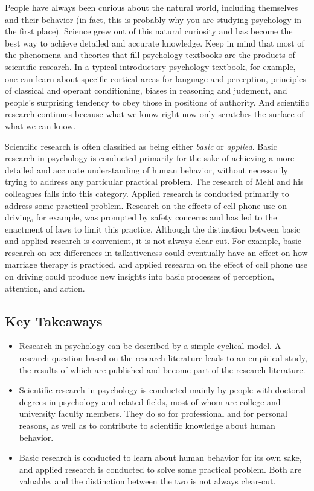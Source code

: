 \documentclass[]{book}
\theoremstyle{definition}
\theoremstyle{definition}
\theoremstyle{remark}
\begin{document}
People have always been curious about the natural world, including
themselves and their behavior (in fact, this is probably why you are
studying psychology in the first place). Science grew out of this
natural curiosity and has become the best way to achieve detailed and
accurate knowledge. Keep in mind that most of the phenomena and theories
that fill psychology textbooks are the products of scientific research.
In a typical introductory psychology textbook, for example, one can
learn about specific cortical areas for language and perception,
principles of classical and operant conditioning, biases in reasoning
and judgment, and people's surprising tendency to obey those in
positions of authority. And scientific research continues because what
we know right now only scratches the surface of what we can know.

Scientific research is often classified as being either \emph{basic} or
\emph{applied}. Basic research in psychology is conducted primarily for
the sake of achieving a more detailed and accurate understanding of
human behavior, without necessarily trying to address any particular
practical problem. The research of Mehl and his colleagues falls into
this category. Applied research is conducted primarily to address some
practical problem. Research on the effects of cell phone use on driving,
for example, was prompted by safety concerns and has led to the
enactment of laws to limit this practice. Although the distinction
between basic and applied research is convenient, it is not always
clear-cut. For example, basic research on sex differences in
talkativeness could eventually have an effect on how marriage therapy is
practiced, and applied research on the effect of cell phone use on
driving could produce new insights into basic processes of perception,
attention, and action.

\subsection{Key Takeaways}\label{key-takeaways-1}

\begin{itemize}
\item
  Research in psychology can be described by a simple cyclical model. A
  research question based on the research literature leads to an
  empirical study, the results of which are published and become part of
  the research literature.
\item
  Scientific research in psychology is conducted mainly by people with
  doctoral degrees in psychology and related fields, most of whom are
  college and university faculty members. They do so for professional
  and for personal reasons, as well as to contribute to scientific
  knowledge about human behavior.
\item
  Basic research is conducted to learn about human behavior for its own
  sake, and applied research is conducted to solve some practical
  problem. Both are valuable, and the distinction between the two is not
  always clear-cut.
\end{itemize}
\end{document}
